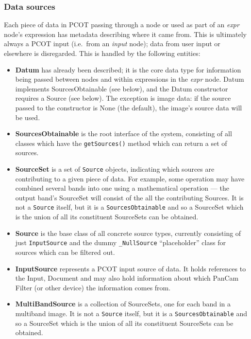 \subsubsection{Data sources}
\label{sources}
Each piece of data in PCOT passing through a node or used as part of an
\emph{expr} node's expression has metadata describing where it came from.
This is ultimately always a PCOT input (i.e.\ from an \emph{input} node);
data from user input or elsewhere is disregarded. This is handled by the following
entities:
\begin{itemize}
\item \textbf{Datum} has already been described; it is the core data type for information
being passed between nodes and within expressions in the \emph{expr} node. Datum implements SourcesObtainable
(see below), and the Datum constructor requires a Source (see below). The exception is image data: if the source passed
to the constructor is None (the default), the image's source data will be used.
\item \textbf{SourcesObtainable} is the root interface of the system, consisting of
all classes which have the \texttt{getSources()} method which can return a set of sources.
\item \textbf{SourceSet} is a set of \texttt{Source} objects, indicating which
sources are contributing to a given piece of data. For example, some operation
may have combined several bands into one using a mathematical operation ---
the output band's SourceSet will consist of the all the contributing Sources.
It is not a \texttt{Source} itself, but it is a \texttt{SourcesObtainable} and
so a SourceSet which is the union of all its constituent SourceSets can be
obtained.
\item \textbf{Source} is the base class of all concrete source types, currently consisting
of just \texttt{InputSource} and the dummy \texttt{\_NullSource} ``placeholder'' class for
sources which can be filtered out. 
\item \textbf{InputSource} represents a PCOT input source of data. It holds references to
the Input, Document and may also hold information about which PanCam Filter (or other device)
the information comes from.
\item \textbf{MultiBandSource} is a collection of SourceSets, one for each band in a multiband
image. It is not a \texttt{Source} itself, but it is a \texttt{SourcesObtainable} and so
a SourceSet which is the union of all its constituent SourceSets can be obtained.
\end{itemize}
